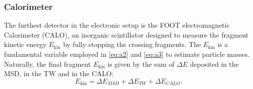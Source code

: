 \subsubsection{Calorimeter}\label{sssec:calorimeter}
The furthest detector in the electronic setup is the FOOT electromagnetic Calorimeter (CALO), an inorganic scintillator designed to measure the fragment kinetic energy $E_\text{kin}$ by fully stopping the crossing fragments. The $E_\text{kin}$ is a fundamental variable employed in \autoref{eq:a2} and \autoref{eq:a3} to estimate particle masses. Naturally, the final fragment $E_\text{kin}$ is given by the sum of $\Delta E$ deposited in the MSD, in the TW and in the CALO:
\begin{equation}
	E_\text{kin}=\Delta E_{MSD}+\Delta E_{TW}+\Delta E_{CALO}.
	\label{eq:kinetic_energy}
\end{equation}

